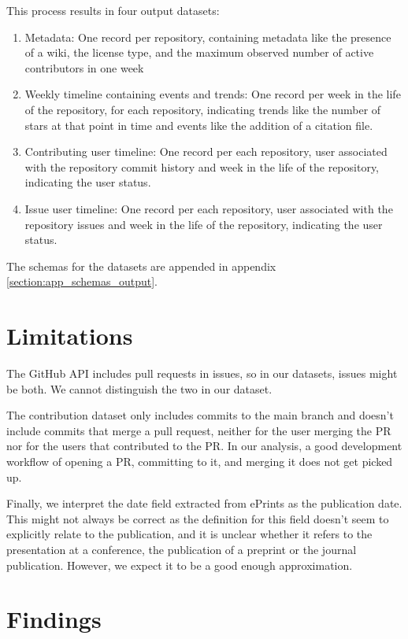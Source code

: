 \documentclass[10pt,a4paper]{scrartcl}
\begin{document}
This process results in four output datasets:
\begin{enumerate}
    \item Metadata: One record per repository, containing metadata like the presence of a wiki, the license type, and the maximum observed number of active contributors in one week
    \item Weekly timeline containing events and trends: One record per week in the life of the repository, for each repository, indicating trends like the number of stars at that point in time and events like the addition of a citation file.
    \item Contributing user timeline: One record per each repository, user associated with the repository commit history and week in the life of the repository, indicating the user status.
    \item Issue user timeline: One record per each repository, user associated with the repository issues and week in the life of the repository, indicating the user status.
\end{enumerate}

The schemas for the datasets are appended in appendix \ref{section:app_schemas_output}.

\section{Limitations}

The GitHub API includes pull requests in issues, so in our datasets, issues might be both.
We cannot distinguish the two in our dataset.

The contribution dataset only includes commits to the main branch and doesn't include commits that merge a pull request, neither for the user merging the PR nor for the users that contributed to the PR.
In our analysis, a good development workflow of opening a PR, committing to it, and merging it does not get picked up.

Finally, we interpret the date field extracted from ePrints as the publication date.
This might not always be correct as the definition for this field doesn't seem to explicitly relate to the publication,
and it is unclear whether it refers to the presentation at a conference, the publication of a preprint or the journal publication.
However, we expect it to be a good enough approximation. 

\section{Findings}
\end{document}
